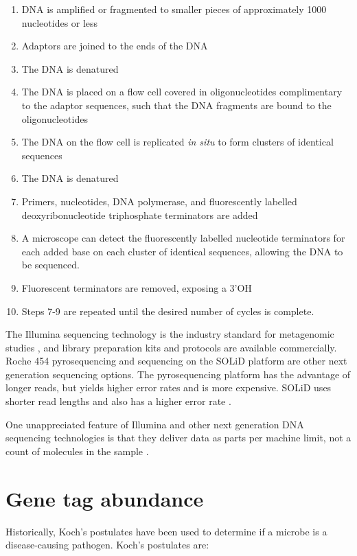 \begin{enumerate}
\item DNA is amplified or fragmented to smaller pieces of approximately 1000 nucleotides or less
\item Adaptors are joined to the ends of the DNA
\item The DNA is denatured
\item The DNA is placed on a flow cell covered in oligonucleotides complimentary to the adaptor sequences, such that the DNA fragments are bound to the oligonucleotides
\item The DNA on the flow cell is replicated \textit{in situ} to form clusters of identical sequences
\item The DNA is denatured
\item Primers, nucleotides, DNA polymerase, and fluorescently labelled deoxyribonucleotide triphosphate terminators are added
\item A microscope can detect the fluorescently labelled nucleotide terminators for each added base on each cluster of identical sequences, allowing the DNA to be sequenced.
\item Fluorescent terminators are removed, exposing a 3'OH
\item Steps 7-9 are repeated until the desired number of cycles is complete.
\end{enumerate}

The Illumina sequencing technology is the industry standard for metagenomic studies \cite{bentley2008accurate}, and library preparation kits and protocols are available commercially. Roche 454 pyrosequencing \cite{margulies2005genome} and sequencing on the SOLiD platform \cite{shendure2005accurate} \cite{mckernan2009reagents} are other next generation sequencing options. The pyrosequencing platform has the advantage of longer reads, but yields higher error rates and is more expensive. SOLiD uses shorter read lengths and also has a higher error rate \cite{mardis2008next} \cite{shendure2008next}.

One unappreciated feature of Illumina and other next generation DNA sequencing technologies is that they deliver data as parts per machine limit, not a count of molecules in the sample \cite{fernandes2013anova} \cite{fernandes2014unifying} \cite{gloor2010microbiome} \cite{gloor2016compositional} \cite{gloor2016s}.

\section{Gene tag abundance}
Historically, Koch’s postulates have been used to determine if a microbe is a disease-causing pathogen. Koch's postulates are:


